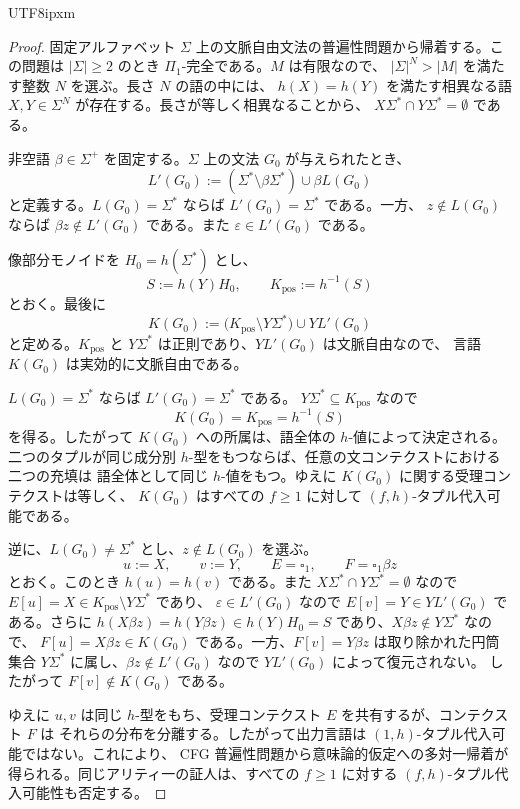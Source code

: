 \documentclass[10pt,a4paper]{article}
\theoremstyle{remark}
\newcommand{\blank}{\square}
\newcommand{\eps}{\varepsilon}
\begin{document}
\begin{CJK}{UTF8}{ipxm}
\begin{proof}
固定アルファベット \(\Sigma\) 上の文脈自由文法の普遍性問題から帰着する。この問題は
\(|\Sigma|\ge2\) のとき \(\Pi_1\)-完全である。\(M\) は有限なので、
\(|\Sigma|^N>|M|\) を満たす整数 \(N\) を選ぶ。長さ \(N\) の語の中には、
\(h(X)=h(Y)\) を満たす相異なる語 \(X,Y\in\Sigma^N\) が存在する。長さが等しく相異なることから、
\(X\Sigma^*\cap Y\Sigma^*=\emptyset\) である。

非空語 \(\beta\in\Sigma^+\) を固定する。\(\Sigma\) 上の文法 \(G_0\) が与えられたとき、
\[
  L'(G_0):=(\Sigma^*\setminus \beta\Sigma^*)\cup \beta L(G_0)
\]
と定義する。\(L(G_0)=\Sigma^*\) ならば \(L'(G_0)=\Sigma^*\) である。一方、
\(z\notin L(G_0)\) ならば \(\beta z\notin L'(G_0)\) である。また
\(\eps\in L'(G_0)\) である。

像部分モノイドを \(H_0=h(\Sigma^*)\) とし、
\[
  S:=h(Y)H_0,
  \qquad K_{\mathrm{pos}}:=h^{-1}(S)
\]
とおく。最後に
\[
  K(G_0):=\bigl(K_{\mathrm{pos}}\setminus Y\Sigma^*\bigr)\cup YL'(G_0)
\]
と定める。\(K_{\mathrm{pos}}\) と \(Y\Sigma^*\) は正則であり、\(YL'(G_0)\) は文脈自由なので、
言語 \(K(G_0)\) は実効的に文脈自由である。

\(L(G_0)=\Sigma^*\) ならば \(L'(G_0)=\Sigma^*\) である。
\(Y\Sigma^*\subseteq K_{\mathrm{pos}}\) なので
\[
  K(G_0)=K_{\mathrm{pos}}=h^{-1}(S)
\]
を得る。したがって \(K(G_0)\) への所属は、語全体の \(h\)-値によって決定される。
二つのタプルが同じ成分別 \(h\)-型をもつならば、任意の文コンテクストにおける二つの充填は
語全体として同じ \(h\)-値をもつ。ゆえに \(K(G_0)\) に関する受理コンテクストは等しく、
\(K(G_0)\) はすべての \(f\ge1\) に対して \((f,h)\)-タプル代入可能である。

逆に、\(L(G_0)\ne\Sigma^*\) とし、\(z\notin L(G_0)\) を選ぶ。
\[
  u:=X,
  \qquad v:=Y,
  \qquad E=\blank_1,
  \qquad F=\blank_1\beta z
\]
とおく。このとき \(h(u)=h(v)\) である。また
\(X\Sigma^*\cap Y\Sigma^*=\emptyset\) なので
\(E[u]=X\in K_{\mathrm{pos}}\setminus Y\Sigma^*\) であり、
\(\eps\in L'(G_0)\) なので \(E[v]=Y\in YL'(G_0)\) である。さらに
\(h(X\beta z)=h(Y\beta z)\in h(Y)H_0=S\) であり、\(X\beta z\notin Y\Sigma^*\) なので、
\(F[u]=X\beta z\in K(G_0)\) である。一方、\(F[v]=Y\beta z\) は取り除かれた円筒集合
\(Y\Sigma^*\) に属し、\(\beta z\notin L'(G_0)\) なので \(YL'(G_0)\) によって復元されない。
したがって \(F[v]\notin K(G_0)\) である。

ゆえに \(u,v\) は同じ \(h\)-型をもち、受理コンテクスト \(E\) を共有するが、コンテクスト \(F\) は
それらの分布を分離する。したがって出力言語は \((1,h)\)-タプル代入可能ではない。これにより、
CFG 普遍性問題から意味論的仮定への多対一帰着が得られる。同じアリティ一の証人は、すべての
\(f\ge1\) に対する \((f,h)\)-タプル代入可能性も否定する。


\end{proof}
\end{CJK}
\end{document}
